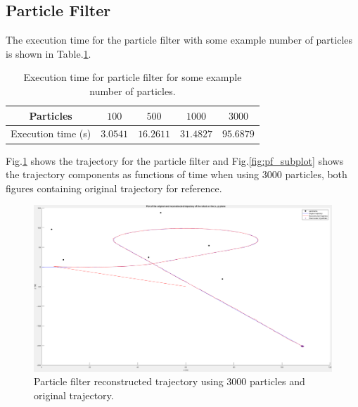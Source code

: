 
\subsection{Particle Filter}
The execution time for the particle filter with some example number of particles is shown in Table.\:\ref{tab:execution_time}.
\begin{table}
    \centering
    \begin{tabular}{c|c|c|c|c}
        Particles          & $100$      & $500$         & $1000$        & $3000$        \\ 
        \hline
        Execution time (s) & $3.0541$   & $16.2611$     & $31.4827$     & $95.6879$
    \end{tabular}
    \caption{Execution time for particle filter for some example number of particles.}
    \label{tab:execution_time}
\end{table}
Fig.\:\ref{fig:pf_trajectory} shows the trajectory for the particle filter and Fig.\:\ref{fig:pf_subplot} shows the trajectory components as functions of time when using $3000$ particles, both figures containing original trajectory for reference.
\begin{figure}
    \centering
    \includegraphics[width=\columnwidth]{images/pf_trajectory.png}
    \caption{Particle filter reconstructed trajectory using 3000 particles and original trajectory.}
    \label{fig:pf_trajectory}
\end{figure}
